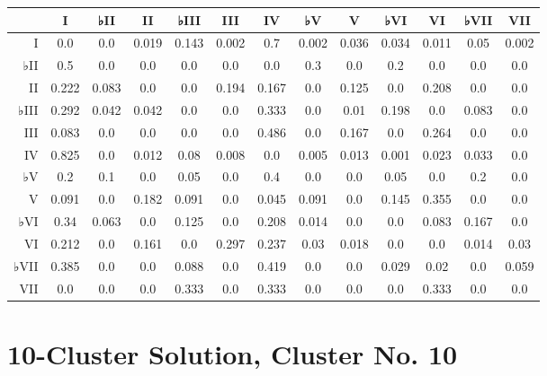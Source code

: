 \begin{table}[htbp]
\begin{minipage}{\linewidth}
\setlength{\tymax}{0.5\linewidth}
\centering
\small
\begin{tabulary}{\textwidth}{@{}RCCCCCCCCCCCC@{}} \toprule
&I&♭II&II&♭III&III&IV&♭V&V&♭VI&VI&♭VII&VII\\
\midrule
I&0.0&0.0&0.019&0.143&0.002&0.7&0.002&0.036&0.034&0.011&0.05&0.002\\
♭II&0.5&0.0&0.0&0.0&0.0&0.0&0.3&0.0&0.2&0.0&0.0&0.0\\
II&0.222&0.083&0.0&0.0&0.194&0.167&0.0&0.125&0.0&0.208&0.0&0.0\\
♭III&0.292&0.042&0.042&0.0&0.0&0.333&0.0&0.01&0.198&0.0&0.083&0.0\\
III&0.083&0.0&0.0&0.0&0.0&0.486&0.0&0.167&0.0&0.264&0.0&0.0\\
IV&0.825&0.0&0.012&0.08&0.008&0.0&0.005&0.013&0.001&0.023&0.033&0.0\\
♭V&0.2&0.1&0.0&0.05&0.0&0.4&0.0&0.0&0.05&0.0&0.2&0.0\\
V&0.091&0.0&0.182&0.091&0.0&0.045&0.091&0.0&0.145&0.355&0.0&0.0\\
♭VI&0.34&0.063&0.0&0.125&0.0&0.208&0.014&0.0&0.0&0.083&0.167&0.0\\
VI&0.212&0.0&0.161&0.0&0.297&0.237&0.03&0.018&0.0&0.0&0.014&0.03\\
♭VII&0.385&0.0&0.0&0.088&0.0&0.419&0.0&0.0&0.029&0.02&0.0&0.059\\
VII&0.0&0.0&0.0&0.333&0.0&0.333&0.0&0.0&0.0&0.333&0.0&0.0\\

\bottomrule

\end{tabulary}
\end{minipage}
\end{table}

\section{10-Cluster Solution, Cluster No. 10}
\label{10-clustersolutionclusterno.10}

